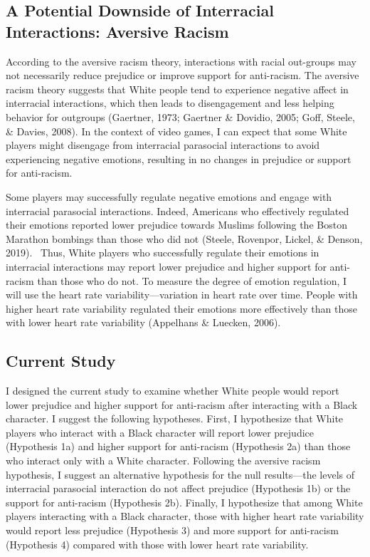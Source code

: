 \documentclass[
  english,
  man, noextraspace,floatsintext]{apa6}
\begin{document}
\hypertarget{a-potential-downside-of-interracial-interactions-aversive-racism}{%
\subsection{A Potential Downside of Interracial Interactions: Aversive Racism}\label{a-potential-downside-of-interracial-interactions-aversive-racism}}

According to the aversive racism theory, interactions with racial out-groups may not necessarily reduce prejudice or improve support for anti-racism. The aversive racism theory suggests that White people tend to experience negative affect in interracial interactions, which then leads to disengagement and less helping behavior for outgroups (Gaertner, 1973; Gaertner \& Dovidio, 2005; Goff, Steele, \& Davies, 2008). In the context of video games, I can expect that some White players might disengage from interracial parasocial interactions to avoid experiencing negative emotions, resulting in no changes in prejudice or support for anti-racism.~

Some players may successfully regulate negative emotions and engage with interracial parasocial interactions. Indeed, Americans who effectively regulated their emotions reported lower prejudice towards Muslims following the Boston Marathon bombings than those who did not (Steele, Rovenpor, Lickel, \& Denson, 2019).~ Thus, White players who successfully regulate their emotions in interracial interactions may report lower prejudice and higher support for anti-racism than those who do not. To measure the degree of emotion regulation, I will use the heart rate variability---variation in heart rate over time. People with higher heart rate variability regulated their emotions more effectively than those with lower heart rate variability (Appelhans \& Luecken, 2006).

\hypertarget{current-study}{%
\subsection{Current Study}\label{current-study}}

I designed the current study to examine whether White people would report lower prejudice and higher support for anti-racism after interacting with a Black character. I suggest the following hypotheses. First, I hypothesize that White players who interact with a Black character will report lower prejudice (Hypothesis 1a) and higher support for anti-racism (Hypothesis 2a) than those who interact only with a White character. Following the aversive racism hypothesis, I suggest an alternative hypothesis for the null results---the levels of interracial parasocial interaction do not affect prejudice (Hypothesis 1b) or the support for anti-racism (Hypothesis 2b). Finally, I hypothesize that among White players interacting with a Black character, those with higher heart rate variability would report less prejudice (Hypothesis 3) and more support for anti-racism (Hypothesis 4) compared with those with lower heart rate variability.~
\end{document}
